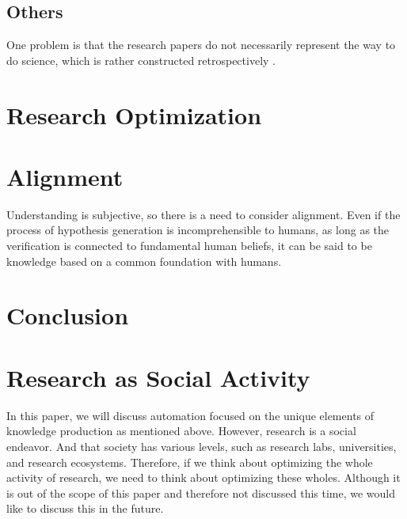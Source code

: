 \documentclass{book}
\begin{document}
\section{Others}
One problem is that the research papers do not necessarily represent the way to do science, which is rather constructed retrospectively \cite{schickore2008doing}.



\chapter{Research Optimization}

\chapter{Alignment}
Understanding is subjective, so there is a need to consider alignment. Even if the process of hypothesis generation is incomprehensible to humans, as long as the verification is connected to fundamental human beliefs, it can be said to be knowledge based on a common foundation with humans.

\chapter{Conclusion}


% 



\appendix
\chapter{Research as Social Activity}
In this paper, we will discuss automation focused on the unique elements of knowledge production as mentioned above. However, research is a social endeavor. And that society has various levels, such as research labs, universities, and research ecosystems. Therefore, if we think about optimizing the whole activity of research, we need to think about optimizing these wholes. Although it is out of the scope of this paper and therefore not discussed this time, we would like to discuss this in the future.
\end{document}
